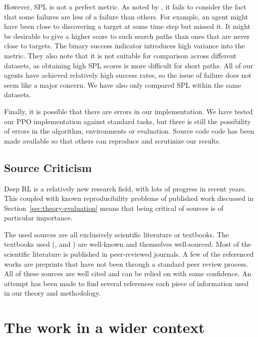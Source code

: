 However, SPL is not a perfect metric. As noted by \cite{batra_objectnav_2020}, it fails to consider the fact that some failures are less of a failure than others.
For example, an agent might have been close to discovering a target at some time step but missed it.
It might be desirable to give a higher score to such search paths than ones that are never close to targets.
The binary success indicator introduces high variance into the metric.
They also note that it is not suitable for comparison across different datasets, as obtaining high SPL scores is more difficult for short paths.
All of our agents have achieved relatively high success rates, so the issue of failure does not seem like a major concern.
We have also only compared SPL within the same datasets.

Finally, it is possible that there are errors in our implementation.
We have tested our PPO implementation against standard tasks, but there is still the possibility of errors in the algorithm, environments or evaluation.
Source code code has been made available so that others can reproduce and scrutinize our results.

\subsection{Source Criticism}

Deep RL is a relatively new research field, with lots of progress in recent years.
This coupled with known reproducibility problems of published work discussed in Section~\ref{sec:theory-evaluation} means that being critical of sources is of particular importance.

The used sources are all exclusively scientific literature or textbooks.
The textbooks used (\cite{russell_artificial_2021}, \cite{sutton_reinforcement_2018} and \cite{goodfellow_deep_2016}) are well-known and themselves well-sourced.
Most of the scientific literature is published in peer-reviewed journals.
A few of the referenced works are preprints that have not been through a standard peer review process.
All of these sources are well cited and can be relied on with some confidence.
An attempt has been made to find several references each piece of information used in our theory and methodology.

\section{The work in a wider context}
\label{sec:discussion-wider}

